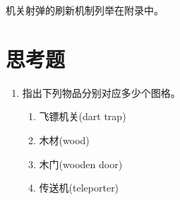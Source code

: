 机关射弹的刷新机制列举在附录中。

\section{思考题}

\begin{enumerate}
\item 指出下列物品分别对应多少个图格。
	\begin{enumerate}
	\item 飞镖机关(dart trap)
	\item 木材(wood)
	\item 木门(wooden door)
	\item 传送机(teleporter)
	\end{enumerate}
\end{enumerate}








